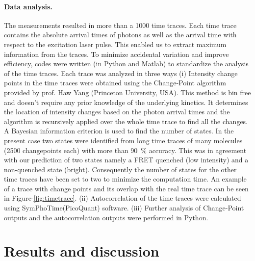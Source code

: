 \paragraph*{Data analysis.}
The measurements resulted in more than a 1000 time traces.
Each time trace contains the absolute arrival times of photons as well as the arrival time with respect to the excitation laser pulse.
This enabled us to extract maximum information from the traces.
To minimize accidental variation and improve efficiency, codes were written (in Python and Matlab) to standardize the analysis of the time traces.
Each trace was analyzed in three ways (i) Intensity change points in the time traces were obtained using the Change-Point algorithm\cite{watkins2005detection} provided by prof. Haw Yang 
(Princeton University, USA).
This method is bin free and doesn't require any prior knowledge of the underlying kinetics.
It determines the location of intensity changes based on the photon arrival times and the algorithm is recursively applied over the whole time trace to find all the changes.
A Bayesian information criterion is used to find the number of states.
In the present case two states were identified from long time traces of many molecules (2500 changepoints each) with more than \SI{90}{\percent} accuracy.
This was in agreement with our prediction of two states namely a FRET quenched (low intensity) and a non-quenched state (bright).
Consequently the number of states for the other time traces have been set to two to minimize the computation time.
An example of a trace with change points and its overlap with the real time trace can be seen in Figure-\ref{fig:timetrace}.
(ii) Autocorrelation of the time traces were calculated using SymPhoTime(PicoQuant) software.
(iii) Further analysis of Change-Point outputs and the autocorrelation outputs were performed in Python.

\section{Results and discussion\label{sec:results}}
